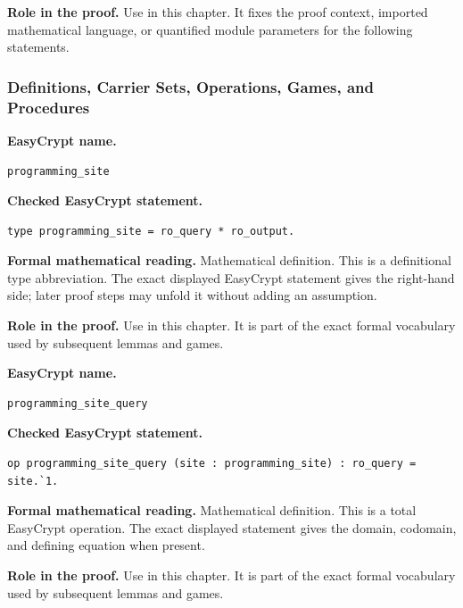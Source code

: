 \noindent\textbf{Role in the proof.}
Use in this chapter. It fixes the proof context, imported mathematical language, or quantified module parameters for the following statements.

\subsubsection*{Definitions, Carrier Sets, Operations, Games, and Procedures}
\begin{formaldefinition}
\noindent\textbf{EasyCrypt name.}
\begin{lstlisting}[language=EasyCrypt,basicstyle=\ttfamily\scriptsize]
programming_site
\end{lstlisting}
\noindent\textbf{Checked EasyCrypt statement.}
\begin{lstlisting}[language=EasyCrypt,basicstyle=\ttfamily\scriptsize]
type programming_site = ro_query * ro_output.
\end{lstlisting}
\noindent\textbf{Formal mathematical reading.}
Mathematical definition. This is a definitional type abbreviation.  The exact displayed EasyCrypt statement gives the right-hand side; later proof steps may unfold it without adding an assumption.

\noindent\textbf{Role in the proof.}
Use in this chapter. It is part of the exact formal vocabulary used by subsequent lemmas and games.

\end{formaldefinition}

\begin{formaldefinition}
\noindent\textbf{EasyCrypt name.}
\begin{lstlisting}[language=EasyCrypt,basicstyle=\ttfamily\scriptsize]
programming_site_query
\end{lstlisting}
\noindent\textbf{Checked EasyCrypt statement.}
\begin{lstlisting}[language=EasyCrypt,basicstyle=\ttfamily\scriptsize]
op programming_site_query (site : programming_site) : ro_query = site.`1.
\end{lstlisting}
\noindent\textbf{Formal mathematical reading.}
Mathematical definition. This is a total EasyCrypt operation.  The exact displayed statement gives the domain, codomain, and defining equation when present.

\noindent\textbf{Role in the proof.}
Use in this chapter. It is part of the exact formal vocabulary used by subsequent lemmas and games.

\end{formaldefinition}


